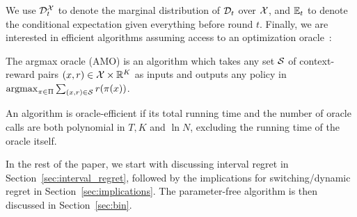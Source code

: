 We use ${\mathcal{D}}_t^{\mathcal{X}}$ to denote
the marginal distribution of ${\mathcal{D}}_t$ over ${\mathcal{X}}$, and $\mathbb{E}_t$ to
denote the conditional expectation given everything before round $t$.
Finally, we are interested in efficient algorithms assuming access to
an optimization oracle~\citep{AgarwalHsKaLaLiSc14}:

\begin{definition}
The argmax oracle (AMO) is an algorithm which takes any set ${\mathcal{S}}$ of
context-reward pairs $(x, r) \in {\mathcal{X}} \times \mathbb{R}^K$ as
inputs and outputs any policy in $\operatorname*{argmax}_{\pi \in \Pi} \sum_{(x,r)\in
  {\mathcal{S}}} r(\pi(x))$.
\end{definition}

An algorithm is oracle-efficient if its total running time and the
number of oracle calls are both polynomial in $T, K$ and $\ln N$,
excluding the running time of the oracle itself. 

In the rest of the paper, we start with discussing interval regret in Section~\ref{sec:interval_regret},
followed by the implications for switching/dynamic regret in Section~\ref{sec:implications}.
The parameter-free algorithm \AdaBIN is then discussed in Section~\ref{sec:bin}.
